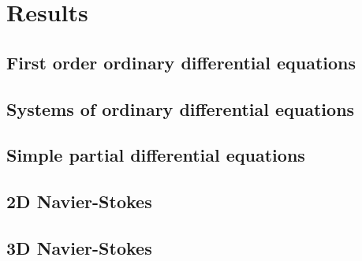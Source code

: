 
\chapter{Results}

\section{First order ordinary differential equations}

\section{Systems of ordinary differential equations}

\section{Simple partial differential equations}

\section{2D Navier-Stokes}

\section{3D Navier-Stokes}





